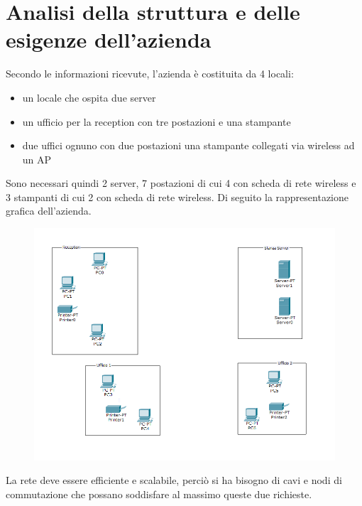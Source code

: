 \section{Analisi della struttura e delle esigenze dell'azienda}

Secondo le informazioni ricevute, l'azienda è costituita da 4 locali:
\begin{itemize}
\item un locale che ospita due server
\item un ufficio per la reception con tre postazioni e una stampante
\item due uffici ognuno con due postazioni una stampante collegati via wireless ad un AP
\end{itemize}
Sono necessari quindi 2 server, 7 postazioni di cui 4 con scheda di rete wireless e 3 stampanti di cui 2 con scheda di rete wireless. Di seguito la rappresentazione grafica dell'azienda. \\
\vspace{40pt}
\begin{figure}[!h]
\includegraphics[scale=0.81]{analisi_strutturale}
\label{fig:as1}
\end{figure}
\vspace{40pt}
La rete deve essere efficiente e scalabile, perciò si ha bisogno di cavi e nodi di commutazione che possano soddisfare al massimo queste due richieste.